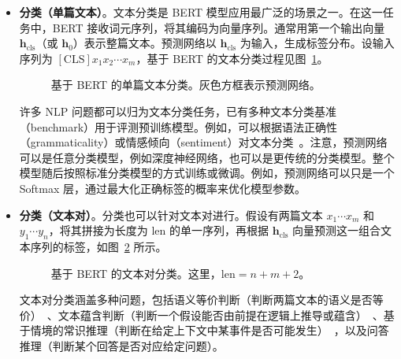 \begin{itemize}
\item \vspace{0.5em} \textbf{分类（单篇文本）}。文本分类是 BERT 模型应用最广泛的场景之一。在这一任务中，BERT 接收词元序列，将其编码为向量序列。通常用第一个输出向量 $\mathbf{h}_{\mathrm{cls}}$（或 $\mathbf{h}_{0}$）表示整篇文本。预测网络以 $\mathbf{h}_{\mathrm{cls}}$ 为输入，生成标签分布。设输入序列为 $\mathrm{[CLS]}x_1 x_2 \cdots x_m$，基于 BERT 的文本分类过程见图~\ref{fig:bert-app-classification-single-text}。

\begin{figure}[!ht]
\centering

\caption{基于 BERT 的单篇文本分类。灰色方框表示预测网络。}
\label{fig:bert-app-classification-single-text}
\end{figure}

    \noindent 许多 NLP 问题都可以归为文本分类任务，已有多种文本分类基准（benchmark）用于评测预训练模型。例如，可以根据语法正确性（grammaticality）或情感倾向（sentiment）对文本分类~\cite{socher-etal:2013recursive,warstadt-etal:2019neural}。注意，预测网络可以是任意分类模型，例如深度神经网络，也可以是更传统的分类模型。整个模型随后按照标准分类模型的方式训练或微调。例如，预测网络可以只是一个 Softmax 层，通过最大化正确标签的概率来优化模型参数。

\item \vspace{0.3em} \textbf{分类（文本对）}。分类也可以针对文本对进行。假设有两篇文本 $x_1 \cdots x_m$ 和 $y_1 \cdots y_n$，将其拼接为长度为 $\mathrm{len}$ 的单一序列，再根据 $\mathbf{h}_{\mathrm{cls}}$ 向量预测这一组合文本序列的标签，如图~\ref{fig:bert-app-classification-two-texts} 所示。

\begin{figure}[!ht]
\centering

\caption{基于 BERT 的文本对分类。这里，$\mathrm{len} = n + m + 2$。}
\label{fig:bert-app-classification-two-texts}
\end{figure}

    \noindent 文本对分类涵盖多种问题，包括语义等价判断（判断两篇文本的语义是否等价）~\cite{dolan-brockett:2005automatically}、文本蕴含判断（判断一个假设能否由前提在逻辑上推导或蕴含）~\cite{bentivogli-giampiccolo:2011rte,williams-etal:2018broad}、基于情境的常识推理（判断在给定上下文中某事件是否可能发生）~\cite{zellers-etal:2018swag}，以及问答推理（判断某个回答是否对应给定问题）。


\end{itemize}

